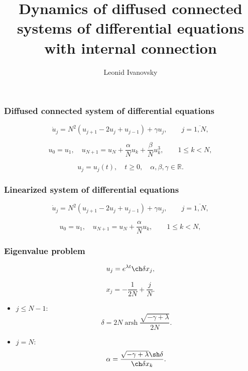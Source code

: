 \documentclass[fullscreen=true, unicode, bookmarks=false]{beamer}
\title[]{ {\huge Dynamics of diffused connected systems of differential equations with internal connection } }
\author[]{{\large Leonid Ivanovsky}}
\date{ }
\institute[]
{ P.G. Demidov Yaroslavl State University }
\DeclareMathOperator{\arsh}{arsh}
\begin{document}
\begin{frame}
\titlepage
\end{frame} 

\begin{frame}
\frametitle{ Diffused connected system of differential equations }
 
\begin{equation}
	\dot u_j = N^2(u_{j+1} - 2u_j + u_{j-1}) + \gamma u_j, \qquad j = \overline{1, N},
\end{equation}

\begin{equation}
	u_0 = u_1, \quad u_{N+1} = u_N + \dfrac{\alpha}{N}u_k + \dfrac{\beta}{N}u_k^3, \qquad 1 \le k < N,
\end{equation}

\bigskip

$$ u_j = u_j(t), \quad t \geqslant 0, \quad \alpha, \beta, \gamma \in \mathbb{R}. $$

\end{frame}

\begin{frame}
\frametitle{ Linearized system of differential equations }
 
\begin{equation}
	\dot u_j = N^2(u_{j+1} - 2u_j + u_{j-1}) + \gamma u_j, \qquad j = \overline{1, N},
\end{equation}

\bigskip

\begin{equation}
	u_0 = u_1, \quad u_{N+1} = u_N + \dfrac{\alpha}{N}u_k, \qquad 1 \leqslant k < N,
\end{equation}

\end{frame}

\begin{frame}
\frametitle{ Eigenvalue problem }
 
$$ u_j = e^{\lambda t} \ch \delta x_j, $$

$$ x_j = -\dfrac{1}{2N} + \dfrac{j}{N}. $$

\bigskip
\pause

\begin{itemize}

\item { $ j \leqslant N-1: $ 
}
\begin{equation}
\delta = 2N \arsh \dfrac{\sqrt{-\gamma+\lambda}}{2N}.
\end{equation}
\medskip
\pause
\item { $ j = N: $ 
}
\begin{equation}
\alpha = \dfrac{\sqrt{-\gamma+\lambda}\sh\delta}{\ch\delta x_k}.
\end{equation}

\end{itemize}

\end{frame}
\end{document}
